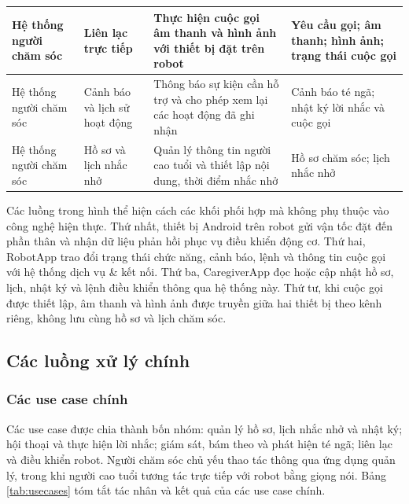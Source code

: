 \begin{longtable}{|p{2.7cm}|p{3.4cm}|p{4.2cm}|p{3.3cm}|}
\hline
Hệ thống người chăm sóc & Liên lạc trực tiếp & Thực hiện cuộc gọi âm thanh và hình ảnh với thiết bị đặt trên robot & Yêu cầu gọi; âm thanh; hình ảnh; trạng thái cuộc gọi \\
\hline
Hệ thống người chăm sóc & Cảnh báo và lịch sử hoạt động & Thông báo sự kiện cần hỗ trợ và cho phép xem lại các hoạt động đã ghi nhận & Cảnh báo té ngã; nhật ký lời nhắc và cuộc gọi \\
\hline
Hệ thống người chăm sóc & Hồ sơ và lịch nhắc nhở & Quản lý thông tin người cao tuổi và thiết lập nội dung, thời điểm nhắc nhở & Hồ sơ chăm sóc; lịch nhắc nhở \\
\hline
\end{longtable}

Các luồng trong hình thể hiện cách các khối phối hợp mà không phụ thuộc vào công nghệ hiện thực. Thứ nhất, thiết bị Android trên robot gửi vận tốc đặt đến phần thân và nhận dữ liệu phản hồi phục vụ điều khiển động cơ. Thứ hai, RobotApp trao đổi trạng thái chức năng, cảnh báo, lệnh và thông tin cuộc gọi với hệ thống dịch vụ \& kết nối. Thứ ba, CaregiverApp đọc hoặc cập nhật hồ sơ, lịch, nhật ký và lệnh điều khiển thông qua hệ thống này. Thứ tư, khi cuộc gọi được thiết lập, âm thanh và hình ảnh được truyền giữa hai thiết bị theo kênh riêng, không lưu cùng hồ sơ và lịch chăm sóc.


\subsection{Các luồng xử lý chính}

\subsubsection{Các use case chính}

Các use case được chia thành bốn nhóm: quản lý hồ sơ, lịch nhắc nhở và nhật ký; hội thoại và thực hiện lời nhắc; giám sát, bám theo và phát hiện té ngã; liên lạc và điều khiển robot. Người chăm sóc chủ yếu thao tác thông qua ứng dụng quản lý, trong khi người cao tuổi tương tác trực tiếp với robot bằng giọng nói. Bảng \ref{tab:usecases} tóm tắt tác nhân và kết quả của các use case chính.


